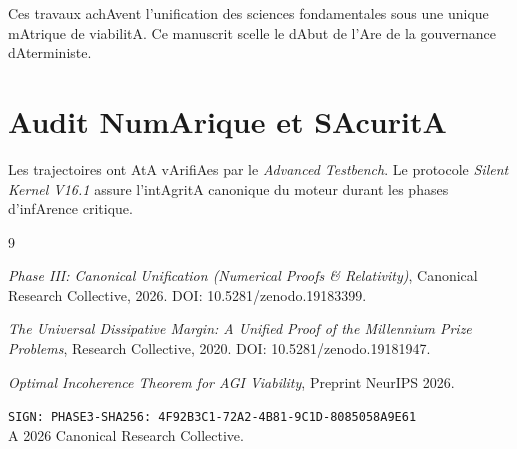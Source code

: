 ﻿\documentclass[11pt,a4paper]{amsart}
\begin{document}
Ces travaux achAvent l'unification des sciences fondamentales sous une unique mAtrique de viabilitA. Ce manuscrit scelle le dAbut de l'Are de la gouvernance dAterministe.



\appendix

\section{Audit NumArique et SAcuritA}

Les trajectoires ont AtA vArifiAes par le \emph{ Advanced Testbench}. Le protocole \emph{Silent Kernel V16.1} assure l'intAgritA canonique du moteur durant les phases d'infArence critique.



\begin{thebibliography}{9}

 \emph{Phase III: Canonical Unification (Numerical Proofs \& Relativity)}, Canonical Research Collective, 2026. DOI: 10.5281/zenodo.19183399.

 \emph{The Universal Dissipative Margin: A Unified Proof of the Millennium Prize Problems}, Research Collective, 2020. DOI: 10.5281/zenodo.19181947.

 \emph{Optimal Incoherence Theorem for AGI Viability}, Preprint NeurIPS 2026.

\end{thebibliography}



\bigskip

\noindent\texttt{SIGN: PHASE3-SHA256: 4F92B3C1-72A2-4B81-9C1D-8085058A9E61} \\

A 2026 Canonical Research Collective.
\end{document}
